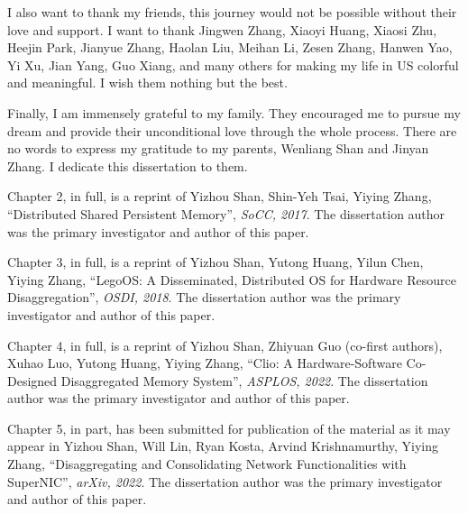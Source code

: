 \begin{acknowledgements}
I also want to thank my friends, this journey would not be possible without their love and support. I want to thank Jingwen Zhang, Xiaoyi Huang, Xiaosi Zhu, Heejin Park, Jianyue Zhang, Haolan Liu, Meihan Li, Zesen Zhang, Hanwen Yao, Yi Xu, Jian Yang, Guo Xiang, and many others for making my life in US colorful and meaningful. I wish them nothing but the best.

Finally, I am immensely grateful to my family.
They encouraged me to pursue my dream and provide their unconditional love
through the whole process. There are no words to express my gratitude to my parents, Wenliang Shan and Jinyan Zhang. I dedicate this dissertation to them.

\hfill \break

Chapter 2, in full, is a reprint of Yizhou Shan, Shin-Yeh Tsai, Yiying Zhang, ``Distributed Shared Persistent Memory'', \textit{SoCC, 2017}. The dissertation author was the primary investigator and author of this paper.

Chapter 3, in full, is a reprint of Yizhou Shan, Yutong Huang, Yilun Chen, Yiying Zhang, ``LegoOS: A Disseminated, Distributed OS for Hardware Resource Disaggregation'', \textit{OSDI, 2018}. The dissertation author was the primary investigator and author of this paper.

Chapter 4, in full, is a reprint of Yizhou Shan, Zhiyuan Guo (co-first authors), Xuhao Luo, Yutong Huang, Yiying Zhang, ``Clio: A Hardware-Software Co-Designed Disaggregated Memory System'', \textit{ASPLOS, 2022}. The dissertation author was the primary investigator and author of this paper.

Chapter 5, in part, has been submitted for publication of the material as it may appear in Yizhou Shan, Will Lin, Ryan Kosta, Arvind Krishnamurthy, Yiying Zhang, ``Disaggregating and Consolidating Network Functionalities with SuperNIC'', \textit{arXiv, 2022}. The dissertation author was the primary investigator and author of this paper.

\end{acknowledgements}
